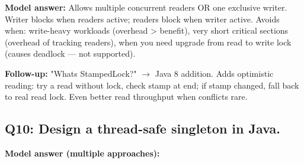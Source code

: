 \documentclass[11pt]{article}
\begin{document}
\textbf{Model answer:} Allows multiple concurrent readers OR one exclusive writer. Writer blocks when readers active; readers block when writer active. Avoids when: write-heavy workloads (overhead \textgreater{} benefit), very short critical sections (overhead of tracking readers), when you need upgrade from read to write lock (causes deadlock --- not supported).

\textbf{Follow-up:} "What\textquotesingle s StampedLock?" \(\rightarrow\) Java 8 addition. Adds optimistic reading: try a read without lock, check stamp at end; if stamp changed, fall back to real read lock. Even better read throughput when conflicts rare.

\subsection{Q10: Design a thread-safe singleton in Java.}\label{q10-design-a-thread-safe-singleton-in-java}

\textbf{Model answer (multiple approaches):}

\end{document}
